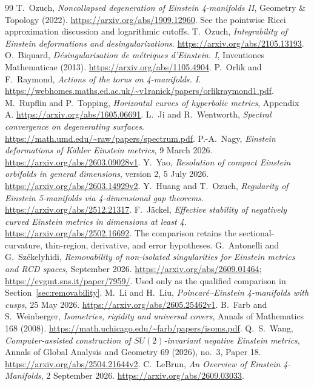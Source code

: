 \documentclass[a4paper,11pt]{article}
\theoremstyle{definition}
\begin{document}
\begin{thebibliography}{99}
 T.~Ozuch, \emph{Noncollapsed degeneration of Einstein
4-manifolds II}, Geometry \& Topology (2022).
\url{https://arxiv.org/abs/1909.12960}. See the pointwise Ricci
approximation discussion and logarithmic cutoffs.
 T.~Ozuch, \emph{Integrability of Einstein deformations
and desingularizations}. \url{https://arxiv.org/abs/2105.13193}.
 O.~Biquard, \emph{D\'esingularisation de m\'etriques
d'Einstein. I}, Inventiones Mathematicae (2013).
\url{https://arxiv.org/abs/1105.4904}.
 P.~Orlik and F.~Raymond, \emph{Actions of the torus on
4-manifolds. I}.
\url{https://webhomes.maths.ed.ac.uk/~v1ranick/papers/orlikraymond1.pdf}.
 M.~Rupflin and P.~Topping, \emph{Horizontal curves
of hyperbolic metrics}, Appendix A.
\url{https://arxiv.org/abs/1605.06691}.
 L.~Ji and R.~Wentworth, \emph{Spectral convergence on
degenerating surfaces}. \url{https://math.umd.edu/~raw/papers/spectrum.pdf}.
 P.-A.~Nagy, \emph{Einstein deformations of K\"ahler
Einstein metrics}, 9 March 2026.
\url{https://arxiv.org/abs/2603.09028v1}.
 Y.~Yao, \emph{Resolution of compact Einstein orbifolds
in general dimensions}, version 2, 5 July 2026.
\url{https://arxiv.org/abs/2603.14929v2}.
 Y.~Huang and T.~Ozuch, \emph{Regularity of Einstein
5-manifolds via 4-dimensional gap theorems}.
\url{https://arxiv.org/abs/2512.21317}.
 F.~J\"ackel, \emph{Effective stability of negatively
curved Einstein metrics in dimensions at least 4}.
\url{https://arxiv.org/abs/2502.16692}. The comparison retains the
sectional-curvature, thin-region, derivative, and error hypotheses.
 G.~Antonelli and G.~Sz\'ekelyhidi, \emph{Removability of
non-isolated singularities for Einstein metrics and RCD spaces},
September 2026. \url{https://arxiv.org/abs/2609.01464};
\url{https://cvgmt.sns.it/paper/7959/}.
Used only as the qualified comparison in Section~\ref{sec:removability}.
 M.~Li and H.~Liu, \emph{Poincar\'e--Einstein
4-manifolds with cusps}, 25 May 2026.
\url{https://arxiv.org/abs/2605.25462v1}.
 B.~Farb and S.~Weinberger, \emph{Isometries, rigidity
and universal covers}, Annals of Mathematics 168 (2008).
\url{https://math.uchicago.edu/~farb/papers/isoms.pdf}.
 Q.~S.~Wang, \emph{Computer-assisted construction of
$SU(2)$-invariant negative Einstein metrics}, Annals of Global Analysis
and Geometry 69 (2026), no.~3, Paper 18.
\url{https://arxiv.org/abs/2504.21644v2}.
 C.~LeBrun, \emph{An Overview of Einstein
4-Manifolds}, 2 September 2026.
\url{https://arxiv.org/abs/2609.03033}.
\end{thebibliography}
\end{document}
